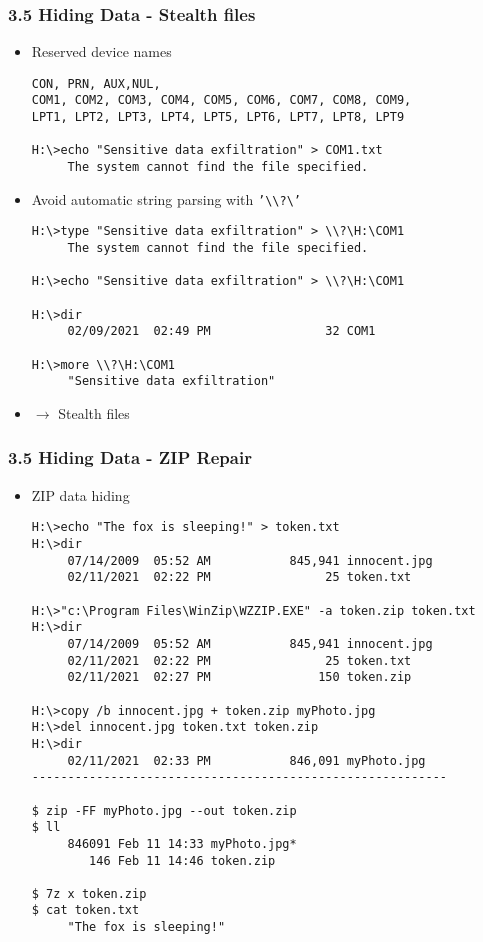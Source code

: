 \begin{frame}[fragile]
  \frametitle{3.5 Hiding Data - Stealth files}
    \begin{itemize}
       \item Reserved device names
\begin{lstlisting}[basicstyle=\tiny]
CON, PRN, AUX,NUL,
COM1, COM2, COM3, COM4, COM5, COM6, COM7, COM8, COM9,
LPT1, LPT2, LPT3, LPT4, LPT5, LPT6, LPT7, LPT8, LPT9

H:\>echo "Sensitive data exfiltration" > COM1.txt
     The system cannot find the file specified.
\end{lstlisting}
       \item Avoid automatic string parsing with \texttt{'\textbackslash\textbackslash?\textbackslash'}
  \begin{lstlisting}[basicstyle=\tiny]
H:\>type "Sensitive data exfiltration" > \\?\H:\COM1
     The system cannot find the file specified.

H:\>echo "Sensitive data exfiltration" > \\?\H:\COM1

H:\>dir
     02/09/2021  02:49 PM                32 COM1

H:\>more \\?\H:\COM1
     "Sensitive data exfiltration"
  \end{lstlisting}
       \item $\to$ Stealth files
    \end{itemize}
\end{frame}


\begin{frame}[fragile]
  \frametitle{3.5 Hiding Data - ZIP Repair}
    \begin{itemize}
       \item ZIP data hiding
\begin{lstlisting}[basicstyle=\tiny]
H:\>echo "The fox is sleeping!" > token.txt
H:\>dir
     07/14/2009  05:52 AM           845,941 innocent.jpg
     02/11/2021  02:22 PM                25 token.txt

H:\>"c:\Program Files\WinZip\WZZIP.EXE" -a token.zip token.txt
H:\>dir
     07/14/2009  05:52 AM           845,941 innocent.jpg
     02/11/2021  02:22 PM                25 token.txt
     02/11/2021  02:27 PM               150 token.zip

H:\>copy /b innocent.jpg + token.zip myPhoto.jpg
H:\>del innocent.jpg token.txt token.zip
H:\>dir
     02/11/2021  02:33 PM           846,091 myPhoto.jpg
---------------------------------------------------------- 

$ zip -FF myPhoto.jpg --out token.zip
$ ll
     846091 Feb 11 14:33 myPhoto.jpg*
        146 Feb 11 14:46 token.zip

$ 7z x token.zip
$ cat token.txt
     "The fox is sleeping!"
\end{lstlisting}
    \end{itemize}
\end{frame}



